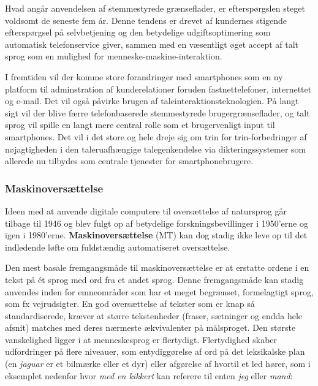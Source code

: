 \begin{multicols}{2}
Hvad ang\aa r anvendelsen af stemmestyrede gr\ae nseflader, er eftersp\o rgslen steget voldsomt de seneste fem \aa r. Denne tendens er drevet af kundernes stigende eftersp\o rgsel \mbox{p\aa} selvbetjening og den betydelige udgiftsoptimering som automatisk telefonservice giver, sammen med en v\ae sentligt \o get accept af talt sprog som en mulighed for menneske-maskine-interaktion.

I fremtiden vil der komme store forandringer med smartphones som en ny platform til adminstration af kunderelationer foruden fastnettelefoner, internettet og e-mail. Det vil \mbox{ogs\aa} p\aa virke brugen af taleinteraktionsteknologien. \mbox{P\aa} langt sigt vil der blive f\ae rre telefonbaserede stemmestyrede brugergr\ae nseflader, og talt sprog vil spille en langt mere central rolle som et brugervenligt input til smartphones. Det vil i det store og hele dreje sig om trin for trin-forbedringer af n\o jagtigheden i den taleruafh\ae ngige talegenkendelse via dikteringssy\-stemer som allerede nu tilbydes som centrale tjenester for smartphonebrugere.

\subsubsection{Maskinovers\ae ttelse}

Ideen med at anvende digitale computere til overs\ae ttelse af natursprog g\aa r tilbage til 1946 og blev fulgt op af betydelige forskningsbevillinger i 1950'erne og igen i 1980'erne. {\bf Maskinovers\ae ttelse} (MT) kan dog stadig ikke leve op til det indledende l\o fte om fuldst\ae ndig automatiseret overs\ae ttelse.


Den mest basale fremgangsm\aa de til maskinovers\ae ttelse er at erstatte ordene i en tekst \mbox{p\aa} \'{e}t  sprog med ord fra et andet sprog. Denne fremgangsm\aa de kan stadig anvendes inden for emneomr\aa der som har et meget begr\ae nset, formelagtigt sprog, som fx vejrudsigter. En god overs\ae ttelse af tekster som er knap \mbox{s\aa} standardiserede, kr\ae ver at st\o rre tekstenheder (fraser, s\ae tninger og endda hele afsnit) matches med deres n\ae rmeste \ae kvivalenter \mbox{p\aa} m\aa lsproget. Den st\o rste vanskelighed ligger i at menneskesprog er flertydigt. Flertydighed skaber udfordringer \mbox{p\aa} flere niveauer, som entydigg\o relse af ord \mbox{p\aa} det leksikalske plan (en {\it jaguar} er et bilm\ae rke eller et dyr) eller afg\o relse af hvortil et led h\o rer, som i eksemplet nedenfor hvor {\it med en kikkert} kan referere til enten {\it jeg} eller {\it mand}:


\end{multicols}
